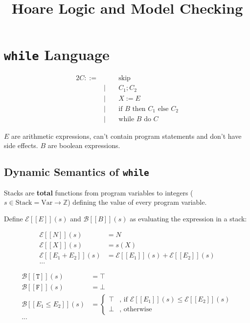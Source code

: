 \documentclass[a4paper, 11pt]{article}
\title{\vspace{-2cm}Hoare Logic and Model Checking\vspace{-2cm}}
\author{}
\date{}
\newcommand{\interp}[2][]{\mathcal{#1}[\![#2]\!]}
\begin{document}
\maketitle
\section*{\texttt{while} Language}
{
    \begin{minipage}[t]{0.4\textwidth}
    \vspace{-7mm}
    \begin{alignat*}{2}
    C ::=& \; &\;&\text{skip} \\
         & | &&C_1 ; C_2 \\
         & | &&X := E \\
         & | &&\text{if }B\text{ then }C_1\text{ else }C_2 \\
         & | &&\text{while }B\text{ do }C
    \end{alignat*}
    \end{minipage}
    \begin{minipage}[t]{0.5\textwidth}
    \(E\) are arithmetic expressions, can't contain program statements and don't have side effects. \(B\) are boolean expressions.
    \end{minipage}

    \subsection*{Dynamic Semantics of \texttt{while}}
    {
        Stacks are \textbf{total} functions from program variables to integers (\(s \in \text{Stack} = \text{Var} \rightarrow \mathbb{Z}\)) defining the value of every program variable.

        Define \(\interp[E]{E}(s)\) and \(\interp[B]{B}(s)\) as evaluating the expression in a stack:

        \begin{minipage}[t]{0.48\textwidth}
        \begin{align*}
        \interp[E]{N}(s) &= N \\
        \interp[E]{X}(s) &= s(X) \\
        \interp[E]{E_1 + E_2}(s) &= \interp[E]{E_1}(s) + \interp[E]{E_2}(s) \\
        ...
        \end{align*}
        \end{minipage}
        \begin{minipage}[t]{0.48\textwidth}
        \begin{align*}
        \interp[B]{\texttt{T}}(s) &= \top \\
        \interp[B]{\texttt{F}}(s) &= \bot \\
        \interp[B]{E_1 \leq E_2}(s) &= \begin{cases}
            \top & \text{, if }\interp[E]{E_1}(s) \leq \interp[E]{E_2}(s) \\
            \bot & \text{, otherwise}
        \end{cases} \\
        ...
        \end{align*}
        \end{minipage}

}}
\end{document}
